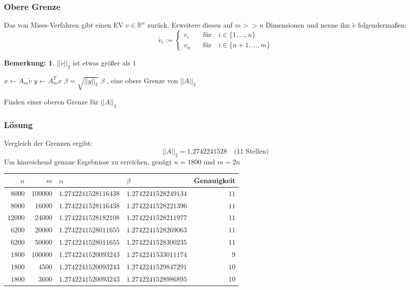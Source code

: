 \documentclass[xcolor = dvipsnames, notheorems, 10pt]{beamer}
\newcommand{\vth}{\vspace{4pt}}
\theoremstyle{definition}
\newtheorem{remark}		{Bemerkung:\vth}
\begin{document}
\begin{frame}
\frametitle{Obere Grenze}
	Das von Mises-Verfahren gibt einen EV $v \in \mathbb{R}^n$ zurück.
	Erweitere diesen auf $m >> n$ Dimensionen und nenne ihn $\tilde{v}$ folgendermaßen:
	$$
	\tilde{v}_i :=
		\begin{cases}
			v_i \quad &\text{für} \quad i \in \{1, \dots, n\} \\
			v_n \quad &\text{für} \quad i \in \{n+1, \dots, m\} 
		\end{cases}
	$$
	\begin{remark}
		$||\tilde{v}||_2$ ist etwas größer als $1$
	\end{remark}

	\begin{algorithm}[H]
		\begin{algorithmic}[1]
			\STATE $x \gets A_m \tilde{v}$
			\STATE $y \gets A_m^T x$
			\STATE $\beta = \sqrt{ ||y||_2 }$
			\RETURN $\beta$ , eine obere Grenze von $||A||_2$
		\end{algorithmic}
		\caption{Finden einer oberen Grenze für $||A||_2$}
	\end{algorithm}
\end{frame}

\begin{frame}
\frametitle{Lösung}
Vergleich der Grenzen ergibt: $$||A||_2 = 1.2742241528 \quad \text{(11 Stellen)}$$
Um hinreichend genaue Ergebnisse zu erreichen, genügt $n = 1800$ und $m = 2n$

	\footnotesize
	\begin{center}
	\begin{tabular}{r|r|l|l|r}
		$n$ 	& $m$ 		& $\alpha$ 				& $\beta$				& Genauigkeit			\\ \hline \hline
		$8000$ 	& $100000$	& $1.2742241528116438$	& $1.2742241528249134$	& $11$	\\
		$8000$	& $16000$	& $1.2742241528116438$	& $1.2742241528221396$	& $11$	\\
		$12000$	& $24000$	& $1.2742241528182108$	& $1.2742241528211977$ 	& $11$ 	\\
		$6200$	& $20000$	& $1.2742241528011655$	& $1.2742241528269063$	& $11$ 	\\
		$6200$	& $50000$	& $1.2742241528011655$	& $1.2742241528300235$	& $11$ 	\\
		$1800$	& $100000$	& $1.2742241520093243$	& $1.2742241533011174$	& $9$ 	\\
		$1800$	& $4500$	& $1.2742241520093243$	& $1.2742241529847291$	& $10$ 	\\
		$1800$	& $3600$	& $1.2742241520093243$	& $1.2742241528986895$	& $10$
	\end{tabular}
	\end{center}
	\normalsize

\end{frame}
\end{document}
